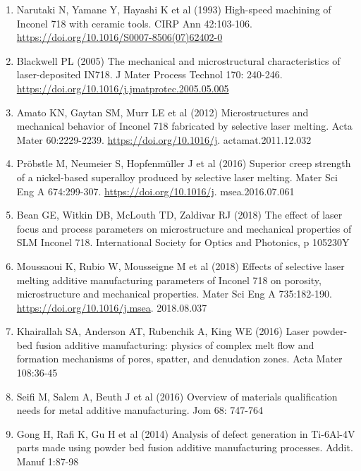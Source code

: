 \documentclass[10pt]{article}
\begin{document}
\begin{enumerate}
  \item Narutaki N, Yamane Y, Hayashi K et al (1993) High-speed machining of Inconel 718 with ceramic tools. CIRP Ann 42:103-106. \href{https://doi.org/10.1016/S0007-8506(07)62402-0}{https://doi.org/10.1016/S0007-8506(07)62402-0}

  \item Blackwell PL (2005) The mechanical and microstructural characteristics of laser-deposited IN718. J Mater Process Technol 170: 240-246. \href{https://doi.org/10.1016/j.jmatprotec.2005.05.005}{https://doi.org/10.1016/j.jmatprotec.2005.05.005}

  \item Amato KN, Gaytan SM, Murr LE et al (2012) Microstructures and mechanical behavior of Inconel 718 fabricated by selective laser melting. Acta Mater 60:2229-2239. \href{https://doi.org/10.1016/j}{https://doi.org/10.1016/j}. actamat.2011.12.032

  \item Pröbstle M, Neumeier S, Hopfenmüller J et al (2016) Superior creep strength of a nickel-based superalloy produced by selective laser melting. Mater Sci Eng A 674:299-307. \href{https://doi.org/10.1016/j}{https://doi.org/10.1016/j}. msea.2016.07.061

  \item Bean GE, Witkin DB, McLouth TD, Zaldivar RJ (2018) The effect of laser focus and process parameters on microstructure and mechanical properties of SLM Inconel 718. International Society for Optics and Photonics, p 105230Y

  \item Moussaoui K, Rubio W, Mousseigne M et al (2018) Effects of selective laser melting additive manufacturing parameters of Inconel 718 on porosity, microstructure and mechanical properties. Mater Sci Eng A 735:182-190. \href{https://doi.org/10.1016/j.msea}{https://doi.org/10.1016/j.msea}. 2018.08.037

  \item Khairallah SA, Anderson AT, Rubenchik A, King WE (2016) Laser powder-bed fusion additive manufacturing: physics of complex melt flow and formation mechanisms of pores, spatter, and denudation zones. Acta Mater 108:36-45

  \item Seifi M, Salem A, Beuth J et al (2016) Overview of materials qualification needs for metal additive manufacturing. Jom 68: 747-764

  \item Gong H, Rafi K, Gu H et al (2014) Analysis of defect generation in Ti-6Al-4V parts made using powder bed fusion additive manufacturing processes. Addit. Manuf 1:87-98


\end{enumerate}
\end{document}

